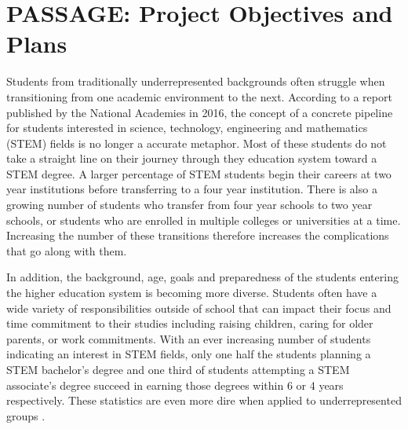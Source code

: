\documentclass[12pt]{article}
\begin{document}
\section{PASSAGE: Project Objectives and Plans}

Students from traditionally underrepresented backgrounds often struggle when transitioning from one academic environment to the next.  According to a report published by the National Academies in 2016, the concept of a concrete pipeline for students interested in science, technology, engineering and mathematics (STEM) fields is no longer a accurate metaphor.  Most of these students do not take a straight line on their journey through they education system toward a STEM degree.  A larger percentage of STEM students begin their careers at two year institutions before transferring to a four year institution.  There is also a growing number of students who transfer from four year schools to two year schools, or students who are enrolled in multiple colleges or universities at a time. Increasing the number of these transitions  therefore increases the complications that go along with them. 

In addition, the background, age, goals and preparedness of the students entering the higher education system is becoming more diverse. Students often have a wide variety of responsibilities outside of school that can impact their focus and time commitment to their studies including raising children, caring for older parents, or work commitments.  With an ever increasing number of students indicating an interest in STEM fields, only one half the students planning a STEM bachelor's degree and one third of students attempting a STEM associate's degree succeed in earning those degrees within 6 or 4 years respectively.  These statistics are even more dire when applied to underrepresented groups \citep{NAP21739}. %
\end{document}
